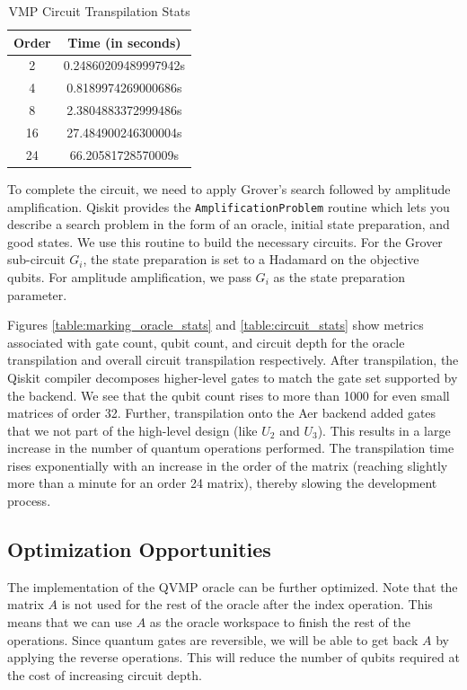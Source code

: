 \documentclass[10pt]{proc}
\theoremstyle{definition}
\theoremstyle{remark}
\begin{document}
\begin{table}[!ht]
  \centering
  \begin{tabular}{|c|c|}
   \hline
    Order & Time (in seconds) \\
   \hline
    2 & 0.24860209489997942s \\
    4 & 0.8189974269000686s \\
    8 & 2.3804883372999486s \\ 
    16 & 27.484900246300004s \\
    24 & 66.20581728570009s \\
    \hline
  \end{tabular}
  \caption{VMP Circuit Transpilation Stats}
  \label{table:transpilation_stats}

\end{table}

To complete the circuit, we need to apply Grover's search followed by amplitude
amplification. Qiskit provides the \verb|AmplificationProblem| routine which lets
you describe a search problem in the form of an oracle, initial state
preparation, and good states. We use this routine to build the necessary
circuits. For the Grover sub-circuit $G_i$, the state preparation is set to a
Hadamard on the objective qubits. For amplitude amplification, we pass $G_i$ as
the state preparation parameter.

Figures \ref{table:marking_oracle_stats} and \ref{table:circuit_stats} show metrics
associated with gate count, qubit count, and circuit depth for the oracle
transpilation and overall circuit transpilation respectively. After
transpilation, the Qiskit compiler decomposes higher-level gates to match the
gate set supported by the backend. We see that the qubit count rises to more
than 1000 for even small matrices of order 32. Further, transpilation onto the
Aer backend added gates that we not part of the high-level design (like $U_2$
and $U_3$). This results in a large increase in the number of quantum
operations performed. The transpilation time rises exponentially with an
increase in the order of the matrix (reaching slightly more than a minute for
an order 24 matrix), thereby slowing the development process.

\vfill

\subsection{Optimization Opportunities}

The implementation of the QVMP oracle can be further optimized. Note that the
matrix $A$ is not used for the rest of the oracle after the index operation.
This means that we can use $A$ as the oracle workspace to finish the rest of
the operations. Since quantum gates are reversible, we will be able to get back
$A$ by applying the reverse operations. This will reduce the number of qubits
required at the cost of increasing circuit depth.
\end{document}
